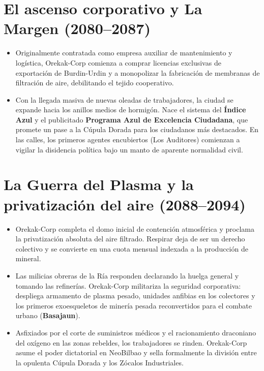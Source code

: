\section{El ascenso corporativo y La Margen (2080--2087)}

\begin{itemize}
  \item {} Originalmente contratada como empresa auxiliar de mantenimiento y logística, Orekak-Corp comienza a comprar licencias exclusivas de exportación de Burdin-Urdin y a monopolizar la fabricación de membranas de filtración de aire, debilitando el tejido cooperativo.
  
  \item {} Con la llegada masiva de nuevas oleadas de trabajadores, la ciudad se expande hacia los anillos medios de hormigón. Nace el sistema del \textbf{Índice Azul} y el publicitado \textbf{Programa Azul de Excelencia Ciudadana}, que promete un pase a la Cúpula Dorada para los ciudadanos más destacados. En las calles, los primeros agentes encubiertos (Los Auditores) comienzan a vigilar la disidencia política bajo un manto de aparente normalidad civil.
\end{itemize}

\section{La Guerra del Plasma y la privatización del aire (2088--2094)}


\begin{itemize}
  \item {} Orekak-Corp completa el domo inicial de contención atmosférica y proclama la privatización absoluta del aire filtrado. Respirar deja de ser un derecho colectivo y se convierte en una cuota mensual indexada a la producción de mineral.
  
  \item {} Las milicias obreras de la Ría responden declarando la huelga general y tomando las refinerías. Orekak-Corp militariza la seguridad corporativa: despliega armamento de plasma pesado, unidades anfibias en los colectores y los primeros exoesqueletos de minería pesada reconvertidos para el combate urbano (\textbf{Basajaun}).
  
  \item {} Asfixiados por el corte de suministros médicos y el racionamiento draconiano del oxígeno en las zonas rebeldes, los trabajadores se rinden. Orekak-Corp asume el poder dictatorial en NeoBilbao y sella formalmente la división entre la opulenta Cúpula Dorada y los Zócalos Industriales.
\end{itemize}

